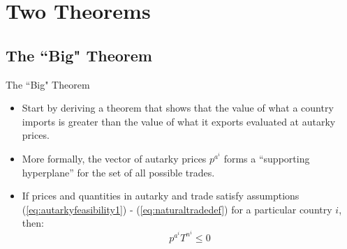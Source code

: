 \documentclass[aspectratio=169]{beamer}
\begin{document}

\section{Two Theorems}


\subsection{The ``Big" Theorem}


\begin{frame}{The ``Big" Theorem}
    \begin{itemize}
        \item<1-> Start by deriving a theorem that shows that the value of what a country imports is greater than the value of what it exports evaluated at autarky prices.
        \item<2-> More formally, the vector of autarky prices $ p^{a^{i}} $ forms a “supporting hyperplane” for the set of all possible trades.
        \item<3-> If prices and quantities in autarky and trade satisfy assumptions (\ref{eq:autarkyfeasibility1}) - (\ref{eq:naturaltradedef}) for a particular country $ i $, then:
        \begin{equation}
            p^{a^{i}} T^{n^{i}} \le 0
            \label{eq:theorem1result}
        \end{equation}
    \end{itemize}
\end{frame}

\end{document}
